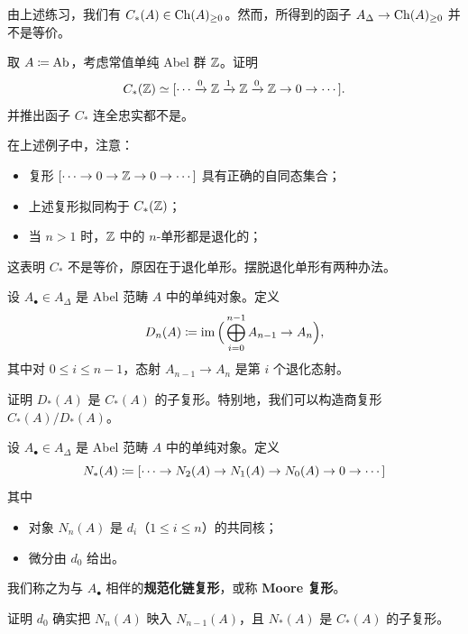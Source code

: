 \nitem\label{L18-1.4} 由上述练习，我们有 $C_{*}(A)\in\operatorname{Ch}(A)_{\ge 0}$。然而，所得到的函子 $A_{\Delta}\to\operatorname{Ch}(A)_{\ge 0}$ 并不是等价。

\begin{exercise}\label{L18-1.5}
取 $A\coloneqq\operatorname{Ab}$，考虑常值单纯 Abel 群 $\mathbb{Z}$。证明
\[
C_{*}(\mathbb{Z})\simeq[\cdots\xrightarrow{0}\mathbb{Z}\xrightarrow{1}\mathbb{Z}\xrightarrow{0}\mathbb{Z}\to 0\to\cdots].
\]
并推出函子 $C_{*}$ 连全忠实都不是。
\end{exercise}

\nitem\label{L18-1.6} 在上述例子中，注意：
\begin{itemize}[leftmargin=2.2em,itemsep=0.1em]
\item 复形 $[\cdots\to 0\to\mathbb{Z}\to 0\to\cdots]$ 具有正确的自同态集合；
\item 上述复形拟同构于 $C_{*}(\mathbb{Z})$；
\item 当 $n>1$ 时，$\mathbb{Z}$ 中的 $n$-单形都是退化的；
\end{itemize}
这表明 $C_{*}$ 不是等价，原因在于退化单形。摆脱退化单形有两种办法。

\begin{construction}\label{L18-1.7}
设 $A_{\bullet}\in A_{\Delta}$ 是 Abel 范畴 $A$ 中的单纯对象。定义
\[
D_{n}(A)\coloneqq\operatorname{im}\Big(\bigoplus_{i=0}^{n-1}A_{n-1}\to A_{n}\Big),
\]
其中对 $0\le i\le n-1$，态射 $A_{n-1}\to A_{n}$ 是第 $i$ 个退化态射。
\end{construction}

\begin{exercise}\label{L18-1.8}
证明 $D_{*}(A)$ 是 $C_{*}(A)$ 的子复形。特别地，我们可以构造商复形 $C_{*}(A)/D_{*}(A)$。
\end{exercise}

\begin{construction}\label{L18-1.9}
设 $A_{\bullet}\in A_{\Delta}$ 是 Abel 范畴 $A$ 中的单纯对象。定义
\[
N_{*}(A)\coloneqq[\cdots\to N_{2}(A)\to N_{1}(A)\to N_{0}(A)\to 0\to\cdots]
\]
其中
\begin{itemize}[leftmargin=2.2em,itemsep=0.1em]
\item 对象 $N_{n}(A)$ 是 $d_{i}$（$1\le i\le n$）的共同核；
\item 微分由 $d_{0}$ 给出。
\end{itemize}
我们称之为与 $A_{\bullet}$ 相伴的\textbf{规范化链复形}，或称 \textbf{Moore 复形}。
\end{construction}

\begin{exercise}\label{L18-1.10}
证明 $d_{0}$ 确实把 $N_{n}(A)$ 映入 $N_{n-1}(A)$，且 $N_{*}(A)$ 是 $C_{*}(A)$ 的子复形。
\end{exercise}

